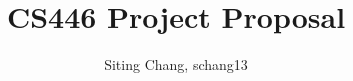 \documentclass[12pt]{article}
\numberwithin{figure}{section}
\begin{document}
\title{CS446 Project Proposal}
\author{Siting Chang, schang13}


\maketitle
\makenomenclature



\end{document}
